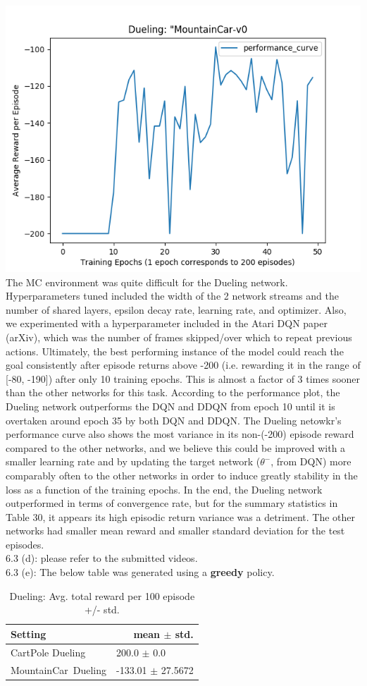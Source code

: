 \documentclass[12pt]{article}
\begin{document}
\begin{tcolorbox}[fit,height=22cm, width=\textwidth, blank, borderline={1pt}{-2pt},nobeforeafter]
    \includegraphics[width=.5\textwidth]{figures/MC_dueling_performance_curve}\\ 
    The MC environment was quite difficult for the Dueling network. Hyperparameters tuned included the width of the 2 network streams and the number of shared layers, epsilon decay rate, learning rate, and optimizer. Also, we experimented with a hyperparameter included in the Atari DQN paper (arXiv), which was the number of frames skipped/over which to repeat previous actions. Ultimately, the best performing instance of the model could reach the goal consistently after episode returns above -200 (i.e. rewarding it in the range of [-80, -190]) after only 10 training epochs. This is almost a factor of 3 times sooner than the other networks for this task. According to the performance plot, the Dueling network outperforms the DQN and DDQN from epoch 10 until it is overtaken around epoch 35 by both DQN and DDQN. The Dueling netowkr's performance curve also shows the most variance in its non-(-200) episode reward compared to the other networks, and we believe this could be improved with a smaller learning rate and by updating the target network ($\theta^{-}$, from DQN) more comparably often to the other networks in order to induce greatly stability in the loss as a function of the training epochs. In the end, the Dueling network outperformed in terms of convergence rate, but for the summary statistics in Table 30, it appears its high episodic return variance was a detriment. The other networks had smaller mean reward and smaller standard deviation for the test episodes.\\
    {\large 6.3 (d):} please refer to the submitted videos. \\
    {\large 6.3 (e):} The below table was generated using a \textbf{greedy} policy.
        \begin{table}[H]
    	\centering
    	\caption{ Dueling:  Avg. total reward per 100 episode +/- std.}
    	\begin{tabular}{|p{9.43em}|r|}
    		\hline
    		\textbf{\small Setting} & \multicolumn{1}{p{10.645em}|}{\textbf{ \small mean $\pm$ std.}} \\
    		\hline
    		{\small CartPole Dueling} & \multicolumn{1}{l|}{\footnotesize 200.0 $\pm$ 0.0}  \\
    		\hline
    		{\small MountainCar Dueling} & \multicolumn{1}{l|}{\footnotesize -133.01 $\pm$ 27.5672} \\
    		\hline
    	\end{tabular}%
    	\label{tab4}%
    \end{table}%
    \end{tcolorbox}
\end{document}
